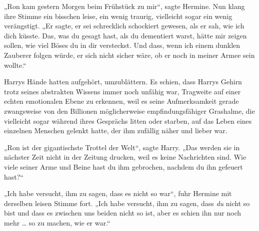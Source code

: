 „Ron kam gestern Morgen beim Frühstück zu mir“, sagte Hermine. Nun klang ihre Stimme ein bisschen leise, ein wenig traurig, vielleicht sogar ein wenig verängstigt.
„Er sagte, er sei schrecklich schockiert gewesen, als er sah, wie ich dich küsste. Das, was du gesagt hast, als du dementiert warst, hätte mir zeigen sollen, wie viel Böses du in dir versteckst. Und dass, wenn ich einem dunklen Zauberer folgen würde, er sich nicht sicher wäre, ob er noch in meiner Armee sein wollte.“

Harrys Hände hatten aufgehört, umzublättern. Es schien, dass Harrys Gehirn trotz seines abstrakten Wissens immer noch unfähig war, Tragweite auf einer echten emotionalen Ebene zu erkennen, weil es seine Aufmerksamkeit gerade zwangsweise von den Billionen möglicherweise empfindungsfähiger Grashalme, die vielleicht sogar während ihres Gesprächs litten oder starben, auf das Leben eines einzelnen Menschen gelenkt hatte, der ihm zufällig näher und lieber war.

„Ron ist der gigantischste Trottel der Welt“, sagte Harry.
„Das werden sie in nächster Zeit nicht in der Zeitung drucken, weil es keine Nachrichten sind. Wie viele seiner Arme und Beine hast du ihm gebrochen, nachdem du ihn gefeuert hast?“

„Ich habe versucht, ihm zu sagen, dass es nicht so war“, fuhr Hermine mit derselben leisen Stimme fort.
„Ich habe versucht, ihm zu sagen, dass \emph{du} nicht so bist und dass es zwischen uns beiden nicht so ist, aber es schien ihn nur noch mehr … so zu machen, wie er war.“

